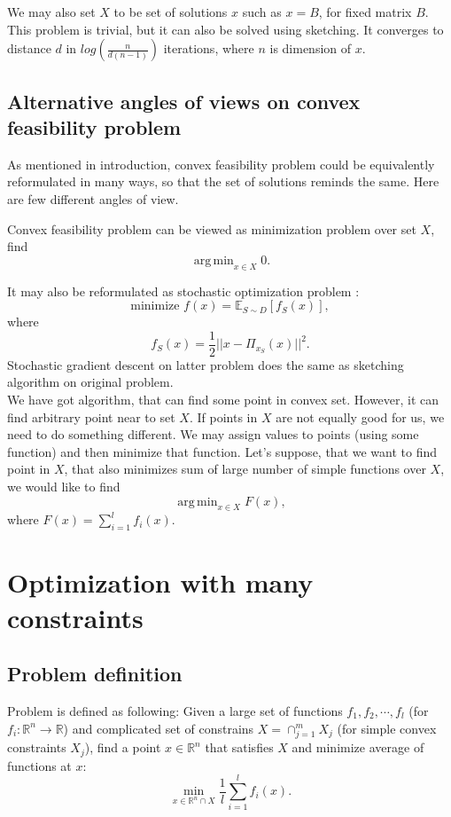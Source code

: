 \documentclass[11pt]{book}
\newcommand{\R}{\mathbb{R}}
\newcommand{\E}{\mathbb{E}}
\DeclareMathOperator*{\argmin}{arg\,min}
\begin{document}
We may also set $X$ to be set of solutions $x$ such as $x=B$, for fixed matrix $B$. This problem is trivial, but it can also be solved using sketching. It converges to distance $d$ in $log(\frac{n}{d(n-1)})$\label{xIsB} iterations, where $n$ is dimension of $x$.\\

\section{Alternative angles of views on convex feasibility problem}
As mentioned in introduction, convex feasibility problem could be equivalently reformulated in many ways, so that the set of solutions reminds the same. Here are few different angles of view.

Convex feasibility problem can be viewed as minimization problem over set $X$, find $$\argmin_{x \in X} 0.$$

It may also be reformulated as stochastic optimization problem \cite{sketchAndProject}: $$\text{minimize } f(x)=\E_{S \sim D}[f_S(x)],$$ where $$f_S(x) = \frac{1}{2}||x-\Pi_{x_S}(x)||^2.$$
Stochastic gradient descent on latter problem does the same as sketching algorithm on original problem.\\

We have got algorithm, that can find some point in convex set. However, it can find arbitrary point near to set $X$. If points in $X$ are not equally good for us, we need to do something different. We may assign values to points (using some function) and then minimize that function. Let's suppose, that we want to find point in $X$, that also minimizes sum of large number of simple functions over $X$, we would like to find $$\argmin_{x \in X} F(x),$$ where $F(x)=\sum_{i=1}^{l}f_i(x).$



\chapter{Optimization with many constraints}

\section{Problem definition}
Problem is defined as following: Given a large set of functions $f_1,f_2,\cdots,f_l$ (for $f_i: \R^n \rightarrow \R$) and complicated set of constrains $X = \cap_{j=1}^m X_j$ (for simple convex constraints $X_j$), find a point $x \in \R^n$ that satisfies $X$ and minimize average of functions at $x$: $$ \min_{x \in \R^n \cap X} \frac{1}{l}\sum_{i=1}^l f_i(x).$$
\end{document}
